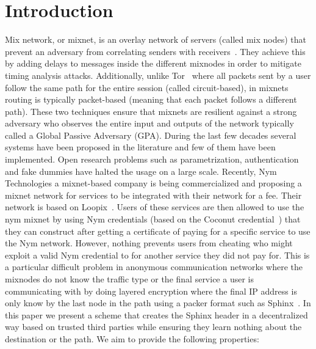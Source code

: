 \section{Introduction}

Mix network, or mixnet, is an overlay network of servers (called mix nodes) that prevent an adversary from correlating senders with receivers~\cite{chaum-mix,cypherpunk-remailer,piotrowska2017loopix,nym-network-whitepaper,danezis2003mixminion, van2015vuvuzela,mixmaster-spec,chaum2016cmix}. They achieve this by adding delays to messages inside the different mixnodes in order to mitigate timing analysis attacks. Additionally, unlike Tor~\cite{onion-routing96} where all packets sent by a user follow the same path for the entire session (called circuit-based), in mixnets routing is typically packet-based (meaning that each packet follows a different path). These two techniques ensure that mixnets are resilient against a strong adversary who observes the entire input and outputs of the network typically called a Global Passive Adversary (GPA).
During the last few decades several systems have been proposed in the literature and few of them have been implemented. Open research problems such as parametrization, authentication and fake dummies have halted the usage on a large scale. Recently, Nym Technologies a mixnet-based company is being commercialized and proposing a mixnet network for services to be integrated with their network for a fee. Their network is based on Loopix~\cite{piotrowska2017loopix}. Users of these services are then allowed to use the nym mixnet by using Nym credentials (based on the Coconut credential~\cite{coconut}) that they can construct after getting a certificate of paying for a specific service to use the Nym network. However, nothing prevents users from cheating who might exploit a valid Nym credential to for another service they did not pay for. This is a particular difficult problem in anonymous communication networks where the mixnodes do not know the traffic type or the final service a user is communicating with by doing layered encryption where the final IP address is only know by the last node in the path using a packer format such as Sphinx~\cite{sphinx}. 
\newline
In this paper we present a scheme that creates the Sphinx header in a decentralized way based on trusted third parties while ensuring they learn nothing about the destination or the path. We aim to provide the following properties:
